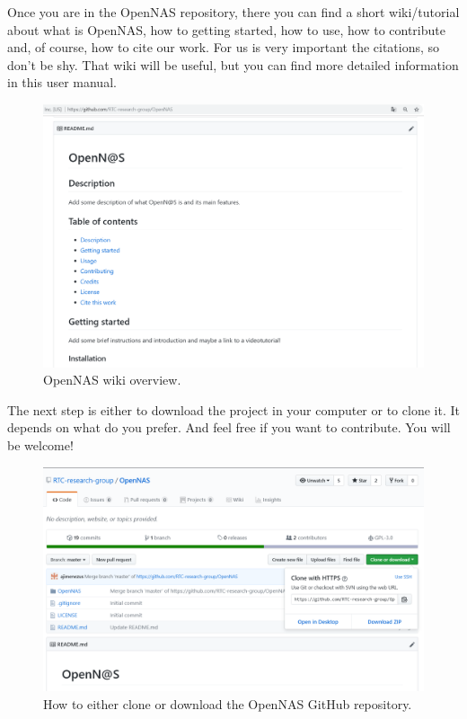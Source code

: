 Once you are in the OpenNAS repository, there you can find a short wiki/tutorial about what is OpenNAS, how to getting started, how to use, how to contribute and, of course, how to cite our work. For us is very important the citations, so don't be shy. That wiki will be useful, but you can find more detailed information in this user manual.

\begin{figure}[H]
\centering
\includegraphics[width=1\textwidth]{images/Img02_OpenNASWiki_GitHub.PNG}
\caption{\label{fig:OpenNAS_wiki}OpenNAS wiki overview.}
\end{figure}

The next step is either to download the project in your computer or to clone it. It depends on what do you prefer. And feel free if you want to contribute. You will be welcome!

\begin{figure}[H]
\centering
\includegraphics[width=1\textwidth]{images/Img03_Clone_DownloadOpenNAS.PNG}
\caption{\label{fig:Download_clone_OpenNAS_repo}How to either clone or download the OpenNAS GitHub repository.}
\end{figure}

